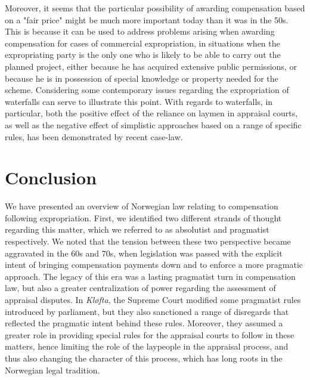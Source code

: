 Moreover, it seems that the particular possibility of awarding compensation based on a "fair price" might be much more important today than it was in the 50s. This is because it can be used to address problems arising when awarding compensation for cases of commercial expropriation, in situations when the expropriating party is the only one who is likely to be able to carry out the planned project, either because he has acquired extensive public permissions, or because he is in possession of special knowledge or property needed for the scheme. Considering some contemporary issues regarding the expropriation of waterfalls can serve to illustrate this point. With regards to waterfalls, in particular, both the positive effect of the reliance on laymen in appraisal courts, as well as the negative effect of simplistic approaches based on a range of specific rules, has been demonstrated by recent case-law.


\section{Conclusion}\label{sec:conc}

We have presented an overview of Norwegian law relating to compensation following expropriation. First, we identified two different strands of thought regarding this matter, which we referred to as absolutist and pragmatist respectively. We noted that the tension between these two perspective became aggravated in the 60s and 70s, when legislation was passed with the explicit intent of bringing compensation payments down and to enforce a more pragmatic approach. The legacy of this era was a lasting pragmatist turn in compensation law, but also a greater centralization of power regarding the assessment of appraisal disputes. In \emph{Kløfta}, the Supreme Court modified some pragmatist rules introduced by parliament, but they also sanctioned a range of disregards that reflected the pragmatic intent behind these rules. Moreover, they assumed a greater role in providing special rules for the appraisal courts to follow in these matters, hence limiting the role of the laypeople in the appraisal process, and thus also changing the character of this process, which has long roots in the Norwegian legal tradition.

